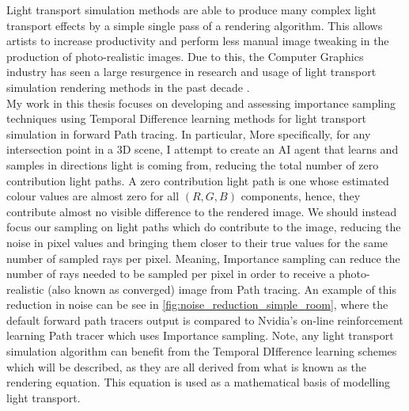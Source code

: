 \documentclass[ %
                    author={Callum Pearce},
                supervisor={Dr. Neill Campbell},
                    degree={MEng},
                     title={How effective are Temporal difference learning methods for reducing the number of zero contribution light paths, while still accurately approximating Global Illumination in Path tracing?},
                  subtitle={},
                      type={research},
                      year={2019} ]{dissertation}
\begin{document}
Light transport simulation methods are able to produce 
many complex light transport effects by a simple single pass of a rendering algorithm.
This allows artists to increase productivity and perform less manual image tweaking
in the production of photo-realistic images. Due to this, the Computer Graphics 
industry has seen a large resurgence in research and usage of light transport simulation 
rendering methods in the past decade \cite{krivanek2014recent}. \\

My work in this thesis focuses on developing and assessing importance sampling 
techniques using Temporal Difference learning methods for light transport simulation 
in forward Path tracing. In particular, More specifically,
for any intersection point in a 3D scene, I attempt to create an AI agent that learns 
and samples in  directions light is coming from, reducing the total number of 
zero contribution light paths. A zero contribution light path is one whose 
estimated colour values are almost zero for all $(R,G,B)$ components, hence,
they contribute almost no visible difference to the rendered image. We should 
instead focus our sampling on light paths which do contribute to the image,
reducing the noise in pixel values and bringing them closer to their true 
values for the same number of sampled rays per pixel. Meaning, Importance 
sampling can reduce the number of rays needed to be sampled per pixel in 
order to receive a photo-realistic (also known as converged) image from Path 
tracing. An example of this reduction in noise can be see in \ref{fig:noise_reduction_simple_room}, where the 
default forward path tracers output is compared to Nvidia's on-line
reinforcement learning Path tracer which uses Importance sampling. Note, any 
light transport simulation algorithm \cite{jensen1996global, keller2016path} can benefit from the Temporal DIfference learning
schemes which will be described, 
as they are all derived from what is known as the rendering equation. This equation
is used as a mathematical basis of modelling light transport.\\
\end{document}
